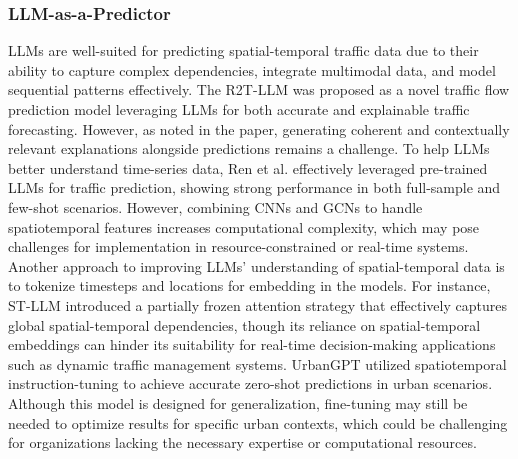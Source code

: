 \subsubsection{LLM-as-a-Predictor}
LLMs are well-suited for predicting spatial-temporal traffic data due to their ability to capture complex dependencies, integrate multimodal data, and model sequential patterns effectively. The R2T-LLM \cite{guo2024responsiblereliabletrafficflow} was proposed as a novel traffic flow prediction model leveraging LLMs for both accurate and explainable traffic forecasting. However, as noted in the paper, generating coherent and contextually relevant explanations alongside predictions remains a challenge. To help LLMs better understand time-series data, Ren et al. \cite{ren2024tpllm} effectively leveraged pre-trained LLMs for traffic prediction, showing strong performance in both full-sample and few-shot scenarios. However, combining CNNs and GCNs to handle spatiotemporal features increases computational complexity, which may pose challenges for implementation in resource-constrained or real-time systems. Another approach to improving LLMs’ understanding of spatial-temporal data is to tokenize timesteps and locations for embedding in the models. For instance, ST-LLM \cite{liu2024spatial} introduced a partially frozen attention strategy that effectively captures global spatial-temporal dependencies, though its reliance on spatial-temporal embeddings can hinder its suitability for real-time decision-making applications such as dynamic traffic management systems. UrbanGPT \cite{li2024urbangpt} utilized spatiotemporal instruction-tuning to achieve accurate zero-shot predictions in urban scenarios. Although this model is designed for generalization, fine-tuning may still be needed to optimize results for specific urban contexts, which could be challenging for organizations lacking the necessary expertise or computational resources.

